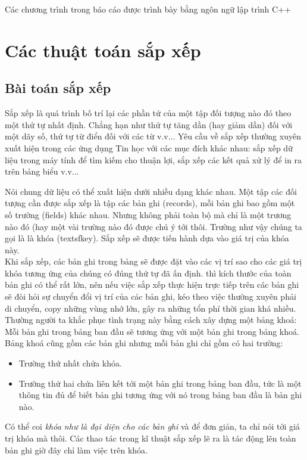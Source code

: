 \documentclass[a4paper,12pt]{report}
\begin{document}
Các chương trình trong báo cáo được trình bày bằng ngôn ngữ lập trình C++
\section{Các thuật toán sắp xếp}
\subsection{Bài toán sắp xếp}

Sắp xếp là quá trình bố trí lại các phần tử của một tập đối tượng nào đó theo một thứ tự nhất định. Chẳng hạn như thử tự tăng dần (hay giảm dần) đối với một dãy số, thứ tự từ điển đối với các từ v.v... Yêu cầu về sắp xếp thường xuyên xuất hiện trong các ứng dụng Tin học với các mục đích khác nhau: sắp xếp dữ liệu trong máy tính để tìm kiếm cho thuận lợi, sắp xếp các kết quả xử lý để in ra trên bảng biểu v.v...

Nói chung dữ liệu có thể xuất hiện dưới nhiều dạng khác nhau. Một tập các đối tượng cần được sắp xếp là tập các bản ghi (records), mỗi bản ghi bao gồm một số trường (fields) khác nhau. Nhưng không phải toàn bộ mà chỉ là một trương nào đó (hay một vài trường nào đó được chú ý tới thôi. Trường như vậy chúng ta gọi là là \textsf{khóa} (textsf{key}). Sắp xếp sẽ được tiến hành dựa vào giá trị của khóa này.\\

Khi sắp xếp, các bản ghi trong bảng sẽ được đặt vào các vị trí sao cho các giá trị khóa tương ứng của chúng có đúng thứ tự đã ấn định. thì kích thước của toàn bản ghi có thể rất lớn, nên
nếu việc sắp xếp thực hiện trực tiếp trên các bản ghi sẽ đòi hỏi sự chuyển đổi vị trí của các
bản ghi, kéo theo việc thường xuyên phải di chuyển, copy những vùng nhớ lớn, gây ra những
tổn phí thời gian khá nhiều. Thường người ta khắc phục tình trạng này bằng cách xây dựng
một bảng khoá: Mỗi bản ghi trong bảng ban đầu sẽ tương ứng với một bản ghi trong \textsf{bảng
khoá}. Bảng khoá cũng gồm các bản ghi nhưng mỗi bản ghi chỉ gồm có hai trường: 
\begin{itemize}
\item Trường thứ nhất chứa khóa.
\item Trường thứ hai chứa liên kết tới một bản ghi trong bảng ban đầu, tức là một thông tin đủ để biết bản ghi tương ứng với nó trong bảng ban đầu là bản ghi nào.
\end{itemize}

Có thể coi \emph{khóa như là đại diện cho các bản ghi} và để đơn giản, ta chỉ nói tới giá trị khóa mà thôi. Các thao tác trong kĩ thuật sắp xếp lẽ ra là tác động lên toàn bản ghi giờ đây chỉ làm việc trên khóa.
\end{document}
